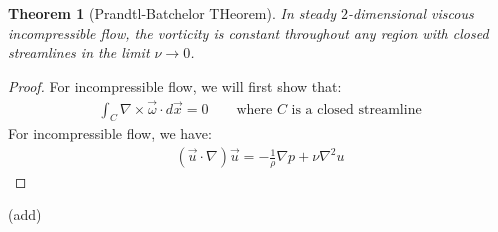 \documentclass[11pt]{book}
\theoremstyle{break}
\theoremstyle{break}
\newtheorem{thm}{Theorem}[section]
\begin{document}
\begin{thm}[Prandtl-Batchelor THeorem]
In steady $2$-dimensional viscous incompressible flow, the vorticity is constant throughout any region with closed streamlines in the limit $\nu \to 0$. 
\end{thm}
\begin{proof}
For incompressible flow, we will first show that:
\begin{align*}
\int_C \nabla \times \vec{\omega}\cdot d\vec{x}=0\qquad \text{where }C\text{ is a closed streamline}
\end{align*}
For incompressible flow, we have:
\begin{align*}
(\vec{u} \cdot \nabla) \vec{u} = -\frac{1}{\rho }\nabla p + \nu \nabla^2 u
\end{align*}
\end{proof}
(add)\\


\newpage
\end{document}
